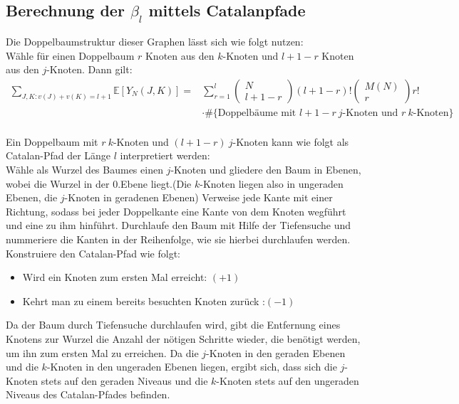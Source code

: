 \documentclass[a4paper, 11pt]{scrreprt}
\newcommand{\EE}{\mathbb{E}}
\begin{document}
\subsection*{Berechnung der $ \beta_l $ mittels Catalanpfade}
Die Doppelbaumstruktur dieser Graphen lässt sich wie folgt nutzen:\\
Wähle für einen Doppelbaum \(r\) Knoten aus den \(k\)-Knoten und \(l+1-r\) Knoten aus den \(j\)-Knoten. Dann gilt:
\begin{equation}
	\begin{split}
	\sum_{J,K: v(J)+v(K) = l+1} \EE[Y_N(J,K)] = &\sum_{r=1}^{l}\begin{pmatrix} N\\ l+1-r\end{pmatrix} (l+1-r)! \begin{pmatrix} M(N)\\r\end{pmatrix} r! \\
	&\cdot \#\{\text{Doppelbäume mit }l+1-r\ j\text{-Knoten und } r\ k\text{-Knoten}\} \\
	\end{split}
\end{equation}

Ein Doppelbaum mit \(r\  k\)-Knoten und \((l+1-r)\ j\)-Knoten kann wie folgt als Catalan-Pfad der Länge \(l\) interpretiert werden:\\
Wähle als Wurzel des Baumes einen \(j\)-Knoten und gliedere den Baum in Ebenen, wobei die Wurzel in der 0.Ebene liegt.(Die \(k\)-Knoten liegen also in ungeraden Ebenen, die \(j\)-Knoten in geradenen Ebenen) Verweise jede Kante mit einer Richtung, sodass bei jeder Doppelkante eine Kante von dem Knoten wegführt und eine zu ihm hinführt. Durchlaufe den Baum mit Hilfe der Tiefensuche und nummeriere die Kanten in der Reihenfolge, wie sie hierbei durchlaufen werden. Konstruiere den Catalan-Pfad wie folgt:
\begin{itemize}
	\item Wird ein Knoten zum ersten Mal erreicht: \((+1)\)
	\item Kehrt man zu einem bereits besuchten Knoten zurück :\((-1)\)
	
\end{itemize}
Da der Baum durch Tiefensuche durchlaufen wird, gibt die Entfernung eines Knotens zur Wurzel die Anzahl der nötigen Schritte wieder, die benötigt werden, um ihn zum ersten Mal zu erreichen. Da die \(j\)-Knoten in den geraden Ebenen und die \(k\)-Knoten in den ungeraden Ebenen liegen, ergibt sich, dass sich die \(j\)-Knoten stets auf den geraden Niveaus und die \(k\)-Knoten stets auf den ungeraden Niveaus des Catalan-Pfades befinden. 
\end{document}
